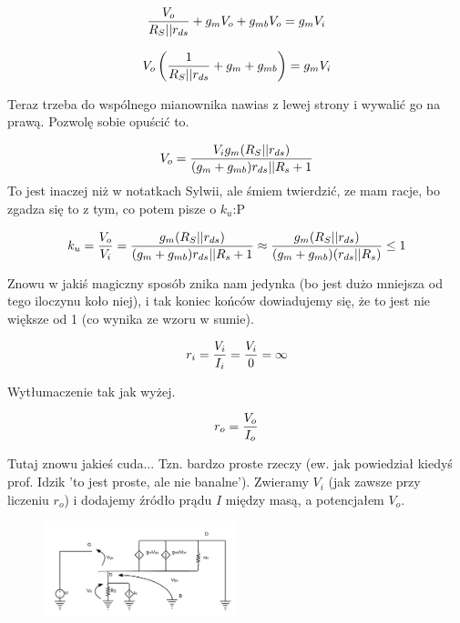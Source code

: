 \documentclass[10pt,a4paper]{article}
\begin{document}
\begin{equation}
{V_o \over R_S || r_{ds}} + g_mV_o + g_{mb}V_{o}= {g_mV_i }
\end{equation}

\begin{equation}
{V_o \left({1\over R_S || r_{ds}} + g_m + g_{mb}\right)= g_mV_i }
\end{equation}

Teraz trzeba do wspólnego mianownika nawias z lewej strony i wywalić go na prawą. Pozwolę sobie opuścić to. 

\begin{equation}
V_o = {V_ig_m(R_S || r_{ds}) \over (g_m + g_{mb})r_{ds}||R_s + 1}
\end{equation}
To jest inaczej niż w notatkach Sylwii, ale śmiem twierdzić, ze mam racje, bo zgadza się to z tym, co potem pisze o $k_u$:P

\begin{equation}
k_u = {V_o \over V_i} = {g_m(R_S || r_{ds}) \over (g_m + g_{mb})r_{ds}||R_s + 1} \approx {g_m(R_S || r_{ds}) \over (g_m + g_{mb})(r_{ds}||R_s)} \leq 1
\end{equation}

Znowu w jakiś magiczny sposób znika nam jedynka (bo jest dużo mniejsza od tego iloczynu koło niej), i tak koniec końców dowiadujemy się, że to jest nie większe od 1 (co wynika ze wzoru w sumie).

\begin{equation}
r_i = {V_i \over I_i} = {V_i \over 0} = \infty
\end{equation}

Wytłumaczenie tak jak wyżej. 

\begin{equation}
r_o = {V_o \over I_o}
\end{equation}

Tutaj znowu jakieś cuda... Tzn. bardzo proste rzeczy (ew. jak powiedział kiedyś prof. Idzik 'to jest proste, ale nie banalne'). Zwieramy $V_i$ (jak zawsze przy liczeniu $r_o$) i dodajemy źródło prądu $I$ między masą, a potencjałem $V_o$.

\begin{figure}[H]
\centering
\includegraphics[width=0.5\textwidth]{CD2.png}
\end{figure}
\end{document}
